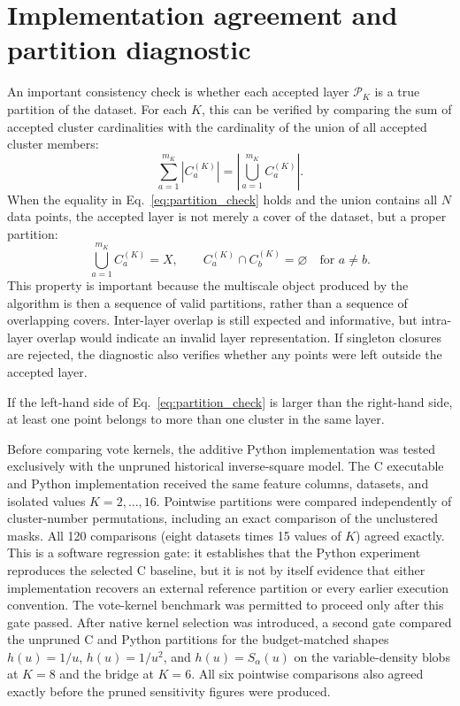 \documentclass[pdflatex,sn-mathphys-num]{sn-jnl}
\newcommand{\calP}{\mathcal{P}}
\begin{document}
\section{Implementation agreement and partition diagnostic}\label{sec:partition_diagnostic}

An important consistency check is whether each accepted layer $\calP_K$ is a true partition of the dataset. For each $K$, this can be verified by comparing the sum of accepted cluster cardinalities with the cardinality of the union of all accepted cluster members:
\begin{equation}
\sum_{a=1}^{m_K}|C_a^{(K)}|=\left|\bigcup_{a=1}^{m_K}C_a^{(K)}\right|.
\label{eq:partition_check}
\end{equation}
When the equality in Eq.~\eqref{eq:partition_check} holds and the union contains all $N$ data points, the accepted layer is not merely a cover of the dataset, but a proper partition:
\begin{equation}
\bigcup_{a=1}^{m_K} C_a^{(K)}=X,
\qquad
C_a^{(K)}\cap C_b^{(K)}=\varnothing
\quad\text{for }a\neq b.
\end{equation}
This property is important because the multiscale object produced by the algorithm is then a sequence of valid partitions, rather than a sequence of overlapping covers. Inter-layer overlap is still expected and informative, but intra-layer overlap would indicate an invalid layer representation. If singleton closures are rejected, the diagnostic also verifies whether any points were left outside the accepted layer.

If the left-hand side of Eq.~\eqref{eq:partition_check} is larger than the right-hand side, at least one point belongs to more than one cluster in the same layer.

Before comparing vote kernels, the additive Python implementation was tested exclusively with the unpruned historical inverse-square model. The C executable and Python implementation received the same feature columns, datasets, and isolated values $K=2,\ldots,16$. Pointwise partitions were compared independently of cluster-number permutations, including an exact comparison of the unclustered masks. All 120 comparisons (eight datasets times 15 values of $K$) agreed exactly. This is a software regression gate: it establishes that the Python experiment reproduces the selected C baseline, but it is not by itself evidence that either implementation recovers an external reference partition or every earlier execution convention. The vote-kernel benchmark was permitted to proceed only after this gate passed.  After native kernel selection was introduced, a second gate compared the unpruned C and Python partitions for the budget-matched shapes $h(u)=1/u$, $h(u)=1/u^2$, and $h(u)=S_\alpha(u)$ on the variable-density blobs at $K=8$ and the bridge at $K=6$.  All six pointwise comparisons also agreed exactly before the pruned sensitivity figures were produced.
\end{document}
